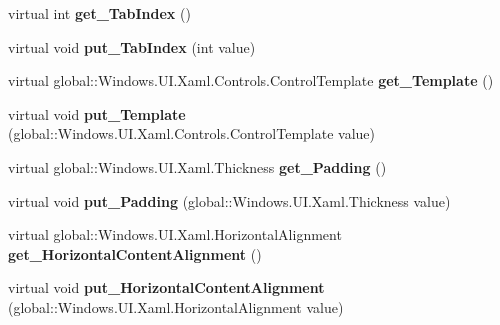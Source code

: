 \begin{DoxyCompactItemize}
virtual int {\bfseries get\+\_\+\+Tab\+Index} ()
\item 
\mbox{\label{class_windows_1_1_u_i_1_1_xaml_1_1_controls_1_1_control_a8314612345a1e430bb7f8d51cdb9b131}} 
virtual void {\bfseries put\+\_\+\+Tab\+Index} (int value)
\item 
\mbox{\label{class_windows_1_1_u_i_1_1_xaml_1_1_controls_1_1_control_a2e40dea64382201f30a45dc2c9db69be}} 
virtual global\+::\+Windows.\+U\+I.\+Xaml.\+Controls.\+Control\+Template {\bfseries get\+\_\+\+Template} ()
\item 
\mbox{\label{class_windows_1_1_u_i_1_1_xaml_1_1_controls_1_1_control_adc937135b0249a6d3425011c1b394db2}} 
virtual void {\bfseries put\+\_\+\+Template} (global\+::\+Windows.\+U\+I.\+Xaml.\+Controls.\+Control\+Template value)
\item 
\mbox{\label{class_windows_1_1_u_i_1_1_xaml_1_1_controls_1_1_control_ae5ac1dbce8d9d993ed0c6ef90a22159d}} 
virtual global\+::\+Windows.\+U\+I.\+Xaml.\+Thickness {\bfseries get\+\_\+\+Padding} ()
\item 
\mbox{\label{class_windows_1_1_u_i_1_1_xaml_1_1_controls_1_1_control_a6898d6903b57a058dd5fb8ef28c5ec58}} 
virtual void {\bfseries put\+\_\+\+Padding} (global\+::\+Windows.\+U\+I.\+Xaml.\+Thickness value)
\item 
\mbox{\label{class_windows_1_1_u_i_1_1_xaml_1_1_controls_1_1_control_ab75bd10489d1a9f3060a3d3d8c060dbd}} 
virtual global\+::\+Windows.\+U\+I.\+Xaml.\+Horizontal\+Alignment {\bfseries get\+\_\+\+Horizontal\+Content\+Alignment} ()
\item 
\mbox{\label{class_windows_1_1_u_i_1_1_xaml_1_1_controls_1_1_control_a529faaf72afad384ebe1f02f4b794a09}} 
virtual void {\bfseries put\+\_\+\+Horizontal\+Content\+Alignment} (global\+::\+Windows.\+U\+I.\+Xaml.\+Horizontal\+Alignment value)
\item 

\end{DoxyCompactItemize}
